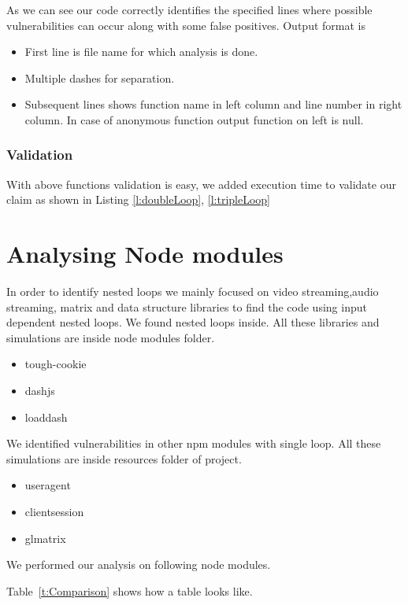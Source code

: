 \documentclass[authoryear,preprint]{sigplanconf}
\begin{document}
As we can see our code correctly identifies the specified lines where possible vulnerabilities can occur along with some false positives.
Output format is
\begin{itemize}
\item First line is file name for which analysis is done.
\item Multiple dashes for separation.
\item Subsequent lines shows function name in left column and line number in right column. In case of anonymous function output function on left is null.

\end{itemize}

\subsubsection{Validation}
With above functions validation is easy, we added execution time to validate our claim as shown in Listing \ref{l:doubleLoop}, \ref{l:tripleLoop}

\section{Analysing Node modules}
In order to identify nested loops we mainly focused on video streaming,audio streaming, matrix and data structure libraries to find the code using input dependent nested loops.
We found nested loops inside.
All these libraries and simulations are inside node modules folder.
\begin{itemize}
\item tough-cookie
\item dashjs
\item loaddash
\end{itemize}

We identified vulnerabilities in other npm modules with single loop.
All these simulations are inside resources folder of project.
\begin{itemize}
\item useragent
\item clientsession
\item glmatrix
\end{itemize}


We performed our analysis on following node modules.

Table~\ref{t:Comparison} shows how a table looks like.
\end{document}
